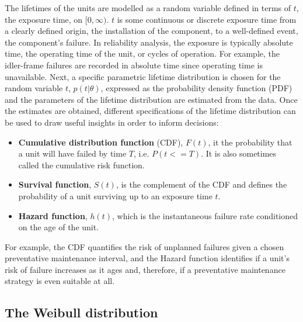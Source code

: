 The lifetimes of the units are modelled as a random variable defined in terms of $t$, the exposure time, on $[0, \infty)$. $t$ is some continuous or discrete exposure time from a clearly defined origin, the installation of the component, to a well-defined event, the component's failure. In reliability analysis, the exposure is typically absolute time, the operating time of the unit, or cycles of operation. For example, the idler-frame failures are recorded in absolute time since operating time is unavailable. Next, a specific parametric lifetime distribution is chosen for the random variable $t$, $p(t|\theta)$, expressed as the probability density function (PDF) and the parameters of the lifetime distribution are estimated from the data. Once the estimates are obtained, different specifications of the lifetime distribution can be used to draw useful insights in order to inform decisions:
\begin{itemize}
    \item \textbf{Cumulative distribution function} (CDF), $F(t)$, it the probability that a unit will have failed by time $T$, i.e. $P(t <= T)$. It is also sometimes called the cumulative risk function.
    \item \textbf{Survival function}, $S(t)$, is the complement of the CDF and defines the probability of a unit surviving up to an exposure time $t$.
    \item \textbf{Hazard function}, $h(t)$, which is the instantaneous failure rate conditioned on the age of the unit.
\end{itemize}
For example, the CDF quantifies the risk of unplanned failures given a chosen preventative maintenance interval, and the Hazard function identifies if a unit's risk of failure increases as it ages and, therefore, if a preventative maintenance strategy is even suitable at all.

\subsection{The Weibull distribution} \label{subsec:weibull-dist}

